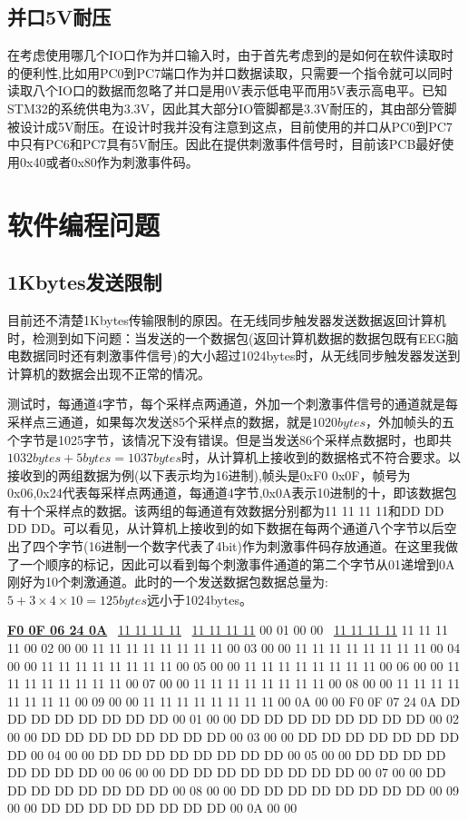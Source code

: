 \subsection{并口5V耐压}

	在考虑使用哪几个IO口作为并口输入时，由于首先考虑到的是如何在软件读取时的便利性,比如用PC0到PC7端口作为并口数据读取，只需要一个指令就可以同时读取八个IO口的数据而忽略了并口是用0V表示低电平而用5V表示高电平。已知STM32的系统供电为3.3V，因此其大部分IO管脚都是3.3V耐压的，其由部分管脚被设计成5V耐压。在设计时我并没有注意到这点，目前使用的并口从PC0到PC7中只有PC6和PC7具有5V耐压。因此在提供刺激事件信号时，目前该PCB最好使用0x40或者0x80作为刺激事件码。


\section{软件编程问题}

\subsection{1Kbytes发送限制}

目前还不清楚1Kbytes传输限制的原因。在无线同步触发器发送数据返回计算机时，检测到如下问题：当发送的一个数据包(返回计算机数据的数据包既有EEG脑电数据同时还有刺激事件信号)的大小超过1024bytes时，从无线同步触发器发送到计算机的数据会出现不正常的情况。

测试时，每通道4字节，每个采样点两通道，外加一个刺激事件信号的通道就是每采样点三通道，如果每次发送85个采样点的数据，就是$1020bytes$，外加帧头的五个字节是1025字节，该情况下没有错误。但是当发送86个采样点数据时，也即共$1032bytes + 5 bytes = 1037 bytes$时，从计算机上接收到的数据格式不符合要求。以接收到的两组数据为例(以下表示均为16进制),帧头是0xF0 0x0F，帧号为0x06,0x24代表每采样点两通道，每通道4字节,0x0A表示10进制的十，即该数据包有十个采样点的数据。该两组的每通道有效数据分别都为11 11 11 11和DD DD DD DD。可以看见，从计算机上接收到的如下数据在每两个通道八个字节以后空出了四个字节(16进制一个数字代表了4bit)作为刺激事件码存放通道。在这里我做了一个顺序的标记，因此可以看到每个刺激事件通道的第二个字节从01递增到0A刚好为10个刺激通道。此时的一个发送数据包数据总量为:$5 + 3 \times 4 \times 10 = 125 bytes$远小于1024bytes。

{ \underline{\bfseries F0 0F 06 24 0A} ~\underline{11 11 11 11} ~\underline{11 11 11 11} 00 01 00 00 ~\underline{11 11 11 11} 11 11 11 11 00 02 00 00 11 11 11 11 11 11 11 11 00 03 00 00 11 11 11 11 11 11 11 11 00 04 00 00 11 11 11 11 11 11 11 11 00 05 00 00 11 11 11 11 11 11 11 11 00 06 00 00 11 11 11 11 11 11 11 11 00 07 00 00 11 11 11 11 11 11 11 11 00 08 00 00 11 11 11 11 11 11 11 11 00 09 00 00 11 11 11 11 11 11 11 11 00 0A 00 00 F0 0F 07 24 0A DD DD DD DD DD DD DD DD 00 01 00 00 DD DD DD DD DD DD DD DD 00 02 00 00 DD DD DD DD DD DD DD DD 00 03 00 00 DD DD DD DD DD DD DD DD 00 04 00 00 DD DD DD DD DD DD DD DD 00 05 00 00 DD DD DD DD DD DD DD DD 00 06 00 00 DD DD DD DD DD DD DD DD 00 07 00 00 DD DD DD DD DD DD DD DD 00 08 00 00 DD DD DD DD DD DD DD DD 00 09 00 00 DD DD DD DD DD DD DD DD 00 0A 00 00}

